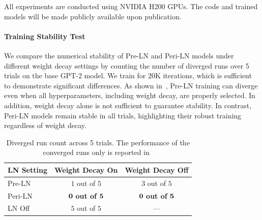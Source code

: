 \documentclass[journal]{IEEEtran}
\theoremstyle{plain}
\theoremstyle{definition}
\theoremstyle{remark}
\begin{document}
All experiments are conducted using NVIDIA H200 GPUs. The code and trained models will be made publicly available upon publication.

\paragraph{Training Stability Test}
We compare the numerical stability of Pre-LN and Peri-LN models under different weight decay settings by counting the number of diverged runs over 5 trials on the base GPT-2 model. We train for $20$K iterations, which is sufficient to demonstrate significant differences. 
As shown in~, Pre-LN training can diverge even when all hyperparameters, including weight decay, are properly selected.  In addition, weight decay alone is not sufficient to guarantee stability. In contrast, Peri-LN models remain stable in all trials, highlighting their robust training regardless of weight decay.

\begin{table}[htbp]
\centering
\caption{Diverged run count across 5 trials. The performance of the converged runs only is reported in~
}
\begin{tabular}{@{}lcc@{}}
\toprule
LN Setting & Weight Decay On & Weight Decay Off \\
\midrule
Pre-LN   & $1$ out of $5$ & $3$ out of $5$ \\
Peri-LN  & $\bf 0$ \textbf{out of} $\bf 5$ & $\bf 0$ \textbf{out of} $\bf 5$ \\
LN Off   & $5$ out of $5$ & ---   \\
\bottomrule
\end{tabular}
\label{tab:blowup_results}
\end{table}
\end{document}
